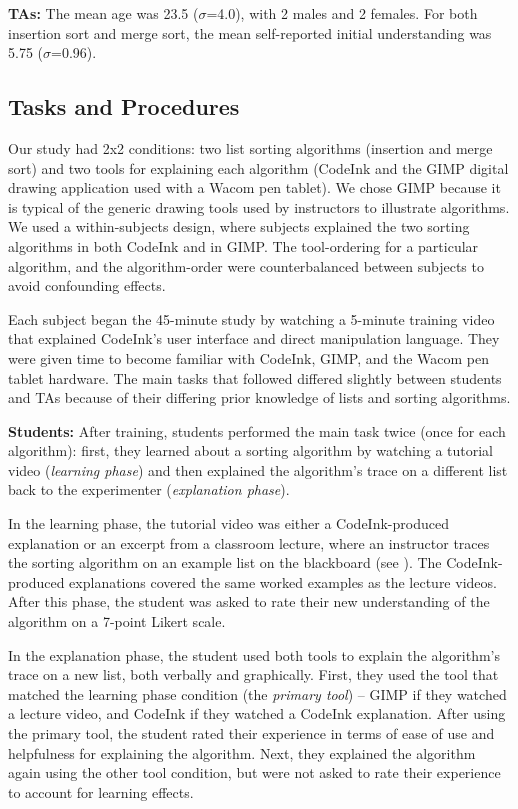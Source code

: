 \noindent \textbf{TAs:} The mean age was 23.5 ($\sigma$=4.0), with 2
males and 2 females. For both insertion sort and merge sort, the mean
self-reported initial understanding was 5.75 ($\sigma$=0.96).


\subsection{Tasks and Procedures}
Our study had 2x2 conditions: two list sorting algorithms (insertion and merge
sort) and two tools for explaining each algorithm (CodeInk and the GIMP digital
drawing application used with a Wacom pen tablet). We chose GIMP because it is
typical of the generic drawing tools used by instructors to illustrate
algorithms. We used a within-subjects design, where subjects explained the two
sorting algorithms in both CodeInk and in GIMP. The tool-ordering for a
particular algorithm, and the algorithm-order were counterbalanced between
subjects to avoid confounding effects.

Each subject began the 45-minute study by watching a 5-minute training video
that explained CodeInk's user interface and direct manipulation language.
They were given time to become familiar with CodeInk, GIMP, and the Wacom pen
tablet hardware. The main tasks that followed differed slightly between students
and TAs because of their differing prior knowledge of lists and sorting
algorithms.

\noindent \textbf{Students:} After training, students performed the main task
twice (once for each algorithm): first, they learned about a sorting algorithm
by watching a tutorial video ({\em learning phase}) and then explained the
algorithm's trace on a different list back to the experimenter ({\em explanation
phase}).

In the learning phase, the tutorial video was either a CodeInk-produced
explanation or an excerpt from a classroom lecture, where an instructor traces
the sorting algorithm on an example list on the blackboard (see
). The CodeInk-produced explanations covered the same
worked examples as the lecture videos. After this phase, the student was asked to rate
their new understanding of the algorithm on a 7-point Likert scale.

In the explanation phase, the student used both tools to explain the algorithm's
trace on a new list, both verbally and graphically. First, they
used the tool that matched the learning phase condition (the {\em primary tool})
-- GIMP if they watched a lecture video, and CodeInk if they watched a CodeInk
explanation.
After using the primary tool, the student rated their experience in terms of
ease of use and helpfulness for explaining the algorithm. Next, they explained
the algorithm again using the other tool condition, but were not asked to rate
their experience to account for learning effects.

